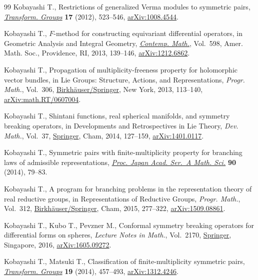 \documentclass[pdftex]{sigma}
\numberwithin{equation}{section}
\begin{document}
\begin{thebibliography}{99}
Kobayashi T., Restrictions of generalized {V}erma modules to symmetric pairs,
 \href{https://doi.org/10.1007/s00031-012-9180-y}{\textit{Transform. Groups}} \textbf{17} (2012), 523--546, \href{https://arxiv.org/abs/1008.4544}{arXiv:1008.4544}.

Kobayashi T., {$F$}-method for constructing equivariant differential operators,
 in Geometric Analysis and Integral Geometry, \href{https://doi.org/10.1090/conm/598/11998}{\textit{Contemp. Math.}}, Vol.~598, Amer. Math. Soc., Providence, RI, 2013, 139--146, \href{https://arxiv.org/abs/1212.6862}{arXiv:1212.6862}.

Kobayashi T., Propagation of multiplicity-freeness property for holomorphic
 vector bundles, in Lie Groups: Structure, Actions, and Representations,
 \textit{Progr. Math.}, Vol.~306, \href{https://doi.org/10.1007/978-1-4614-7193-6_6}{Birkh\"{a}user/Springer}, New York, 2013,
 113--140, \href{https://arxiv.org/abs/math.RT/0607004}{arXiv:math.RT/0607004}.

Kobayashi T., Shintani functions, real spherical manifolds, and symmetry
 breaking operators, in Developments and Retrospectives in {L}ie Theory,
 \textit{Dev. Math.}, Vol.~37, \href{https://doi.org/10.1007/978-3-319-09934-7_5}{Springer}, Cham, 2014, 127--159,
 \href{https://arxiv.org/abs/1401.0117}{arXiv:1401.0117}.

Kobayashi T., Symmetric pairs with finite-multiplicity property for branching
 laws of admissible representations, \href{https://doi.org/10.3792/pjaa.90.79}{\textit{Proc. Japan Acad. Ser.~A Math.
 Sci.}} \textbf{90} (2014), 79--83.

Kobayashi T., A program for branching problems in the representation theory of
 real reductive groups, in Representations of Reductive Groups, \textit{Progr.
 Math.}, Vol.~312, \href{https://doi.org/10.1007/978-3-319-23443-4_10}{Birkh\"{a}user/Springer}, Cham, 2015, 277--322,
 \href{https://arxiv.org/abs/1509.08861}{arXiv:1509.08861}.

Kobayashi T., Kubo T., Pevzner M., Conformal symmetry breaking operators for
 differential forms on spheres, \textit{Lecture Notes in Math.}, Vol.~2170,
 \href{https://doi.org/10.1007/978-981-10-2657-7_1}{Springer}, Singapore, 2016, \href{https://arxiv.org/abs/1605.09272}{arXiv:1605.09272}.

Kobayashi T., Matsuki T., Classification of finite-multiplicity symmetric
 pairs, \href{https://doi.org/10.1007/s00031-014-9265-x}{\textit{Transform. Groups}} \textbf{19} (2014), 457--493,
 \href{https://arxiv.org/abs/1312.4246}{arXiv:1312.4246}.


\end{thebibliography}
\end{document}
